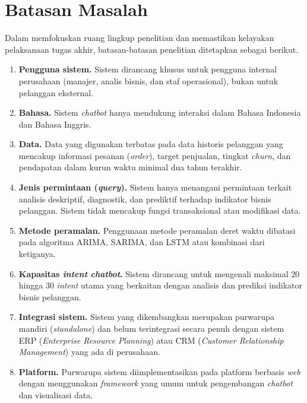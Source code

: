 \section{Batasan Masalah}

Dalam memfokuskan ruang lingkup penelitian dan memastikan kelayakan pelaksanaan tugas akhir, batasan-batasan penelitian ditetapkan sebagai berikut.
\begin{enumerate}
  \item \textbf{Pengguna sistem.} Sistem dirancang khusus untuk pengguna internal perusahaan (manajer, analis bisnis, dan staf operasional), bukan untuk pelanggan eksternal.

  \item \textbf{Bahasa.} Sistem \textit{chatbot} hanya mendukung interaksi dalam Bahasa Indonesia dan Bahasa Inggris.

  \item \textbf{Data.} Data yang digunakan terbatas pada data historis pelanggan yang mencakup informasi pesanan (\textit{order}), target penjualan, tingkat \textit{churn}, dan pendapatan dalam kurun waktu minimal dua tahun terakhir.

  \item \textbf{Jenis permintaan (\textit{query}).} Sistem hanya menangani permintaan terkait analisis deskriptif, diagnostik, dan prediktif terhadap indikator bisnis pelanggan. Sistem tidak mencakup fungsi transaksional atau modifikasi data.

  \item \textbf{Metode peramalan.} Penggunaan metode peramalan deret waktu dibatasi pada algoritma ARIMA, SARIMA, dan LSTM atau kombinasi dari ketiganya.

  \item \textbf{Kapasitas \textit{intent} \textit{chatbot}.} Sistem dirancang untuk mengenali maksimal 20 hingga 30 \textit{intent} utama yang berkaitan dengan analisis dan prediksi indikator bisnis pelanggan.

  \item \textbf{Integrasi sistem.} Sistem yang dikembangkan merupakan purwarupa mandiri (\textit{standalone}) dan belum terintegrasi secara penuh dengan sistem ERP (\textit{Enterprise Resource Planning}) atau CRM (\textit{Customer Relationship Management}) yang ada di perusahaan.

  \item \textbf{Platform.} Purwarupa sistem diimplementasikan pada platform berbasis \textit{web} dengan menggunakan \textit{framework} yang umum untuk pengembangan \textit{chatbot} dan visualisasi data.


\end{enumerate}
